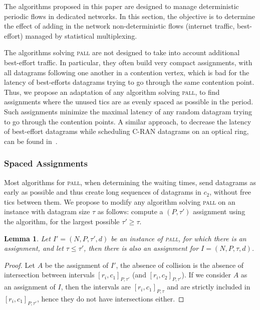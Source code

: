 \documentclass[a4paper,10pt]{journal}
\newtheorem{lemma}[theorem]{Lemma}
\newcommand\pall{\textsc{pall}\xspace}
\begin{document}
    The algorithms proposed in this paper are designed to manage deterministic periodic flows in dedicated networks. In this section, the objective is to determine the effect of adding in the network non-deterministic flows (internet traffic, best-effort) managed by statistical multiplexing.

    The algorithms solving \pall are not designed to take into account additional best-effort traffic. In particular, they often build very compact assignments, with all datagrams following one another in a contention vertex, which is bad for the latency of best-efforts datagrams trying to go through the same contention point. Thus, we propose an adaptation of any algorithm solving \pall, to find assignments where the unused tics are as evenly spaced as possible in the period. Such assignments minimize the maximal latency of any random datagram trying to go through the contention points. A similar approach, to decrease the latency of best-effort datagrams while scheduling C-RAN datagrams on an optical ring, can be found in~\cite{DBLP:conf/ondm/BarthGS19}.
    
    
    \subsubsection{Spaced Assignments}

    Most algorithms for \pall, when determining the waiting times, send datagrams as early as possible
    and thus create long sequences of datagrams in $c_2$, without free tics between them. We propose to modify any algorithm solving \pall on an instance with datagram size $\tau$ as follows: compute a $(P,\tau')$ assignment using the algorithm, for the largest possible $\tau' \geq \tau$. 

    \begin{lemma}\label{lemma:smaller_tau}
    Let $I' = (N,P,\tau',d)$ be an instance of \pall, for which there is an assignment, and let 
    $\tau \leq \tau'$, then there is also an assignment for $I = (N,P,\tau,d)$.
    \end{lemma}  
    \begin{proof}
    Let $A$ be the assignment of $I'$, the absence of collision is the absence of 
    intersection between intervals $[r_i,c_1]_{P,\tau'}$ (and $[r_i,c_2]_{P,\tau'}$). 
    If we consider $A$ as an assignment of $I$, then the intervals are $[r_i,c_1]_{P,\tau}$ and 
    are strictly included in $[r_i,c_1]_{P,\tau'}$, hence they do not have intersections either. 
    \end{proof}
\end{document}
